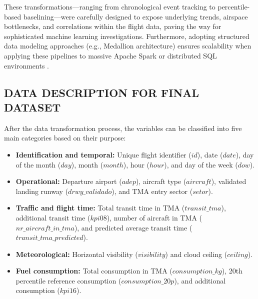 These transformations—ranging from chronological event tracking to percentile-based baselining—were carefully designed to expose underlying trends, airspace bottlenecks, and correlations within the flight data, paving the way for sophisticated machine learning investigations. Furthermore, adopting structured data modeling approaches (e.g., Medallion architecture) ensures scalability when applying these pipelines to massive Apache Spark or distributed SQL environments \cite{databricks_medallion, saha_dataeng}.

\subsection{DATA DESCRIPTION FOR FINAL DATASET}

After the data transformation process, the variables can be classified into five main categories based on their purpose:
\begin{itemize}
    \item \textbf{Identification and temporal:} Unique flight identifier ($id$), date ($date$), day of the month ($day$), month ($month$), hour ($hour$), and day of the week ($dow$).
    \item \textbf{Operational:} Departure airport ($adep$), aircraft type ($aircraft$), validated landing runway ($drwy\_validado$), and TMA entry sector ($setor$).
    \item \textbf{Traffic and flight time:} Total transit time in TMA ($transit\_tma$), additional transit time ($kpi08$), number of aircraft in TMA ($nr\_aircraft\_in\_tma$), and predicted average transit time ($transit\_tma\_predicted$).
    \item \textbf{Meteorological:} Horizontal visibility ($visibility$) and cloud ceiling ($ceiling$).
    \item \textbf{Fuel consumption:} Total consumption in TMA ($consumption\_kg$), 20th percentile reference consumption ($consumption\_20p$), and additional consumption ($kpi16$).
\end{itemize}